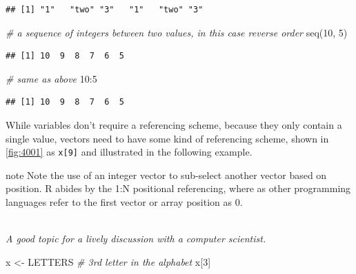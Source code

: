 \documentclass[
]{book}
\newenvironment{Shaded}{\begin{snugshade}}{\end{snugshade}}
\newcommand{\CommentTok}[1]{\textcolor[rgb]{0.56,0.35,0.01}{\textit{#1}}}
\newcommand{\DecValTok}[1]{\textcolor[rgb]{0.00,0.00,0.81}{#1}}
\newcommand{\FunctionTok}[1]{\textcolor[rgb]{0.00,0.00,0.00}{#1}}
\newcommand{\NormalTok}[1]{#1}
\newcommand{\OtherTok}[1]{\textcolor[rgb]{0.56,0.35,0.01}{#1}}
\newcommand{\SpecialCharTok}[1]{\textcolor[rgb]{0.00,0.00,0.00}{#1}}
\begin{document}
\begin{verbatim}
## [1] "1"   "two" "3"   "1"   "two" "3"
\end{verbatim}

\begin{Shaded}
\begin{Highlighting}[]
\CommentTok{\# a sequence of integers between two values, in this case reverse order}
\FunctionTok{seq}\NormalTok{(}\DecValTok{10}\NormalTok{, }\DecValTok{5}\NormalTok{)}
\end{Highlighting}
\end{Shaded}

\begin{verbatim}
## [1] 10  9  8  7  6  5
\end{verbatim}

\begin{Shaded}
\begin{Highlighting}[]
\CommentTok{\# same as above}
\DecValTok{10}\SpecialCharTok{:}\DecValTok{5}
\end{Highlighting}
\end{Shaded}

\begin{verbatim}
## [1] 10  9  8  7  6  5
\end{verbatim}

While variables don't require a referencing scheme, because they only contain a single value, vectors need to have some kind of referencing scheme, shown in \ref{fig:4001} as \texttt{x{[}9{]}} and illustrated in the following example.

\begin{infobox}{note}
Note the use of an integer vector to sub-select another vector based on position. R abides by the 1:N positional referencing, where as other programming languages refer to the first vector or array position as 0.\\
\strut \\
\emph{A good topic for a lively discussion with a computer scientist.}

\end{infobox}

\hfill\break

\begin{Shaded}
\begin{Highlighting}[]
\NormalTok{x }\OtherTok{\textless{}{-}}\NormalTok{ LETTERS}
\CommentTok{\# 3rd letter in the alphabet}
\NormalTok{x[}\DecValTok{3}\NormalTok{]}
\end{Highlighting}
\end{Shaded}
\end{document}
